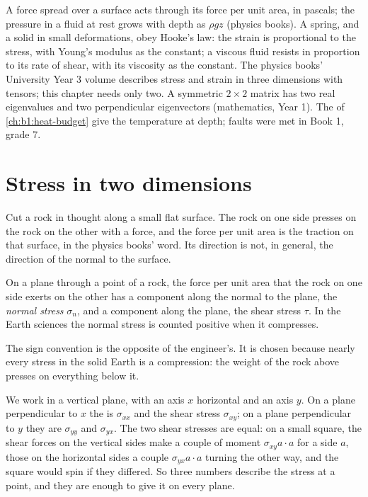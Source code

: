 \begin{recall}
A force spread over a surface acts through its force per unit area, in pascals;
the pressure in a fluid at rest grows with depth as $\rho g z$ (physics books).
A spring, and a solid in small deformations, obey Hooke's law: the strain is
proportional to the stress, with Young's modulus as the constant; a viscous
fluid resists in proportion to its rate of shear, with its viscosity as the
constant. The physics books' University Year 3 volume describes stress and
strain in three dimensions with tensors; this chapter needs only two. A
symmetric $2\times2$ matrix has two real eigenvalues and two perpendicular
eigenvectors (mathematics, Year 1). The  of
\cref{ch:b1:heat-budget} give the temperature at depth; faults were met in
Book 1, grade 7.
\end{recall}

\section{Stress in two dimensions}\label{sec:b1:stress-strain-rheology:stress}

Cut a rock in thought along a small flat surface. The rock on one side presses
on the rock on the other with a force, and the force per unit area is the
traction on that surface, in the physics books' word. Its direction is not, in
general, the direction of the normal to the surface.

\begin{definition}\label{def:b1:stress-strain-rheology:stress}
On a plane through a point of a rock, the force per unit area that the rock on
one side exerts on the other has a component along the normal to the plane,
the \emph{normal stress} $\sigma_n$, and a component
along the plane, the shear stress $\tau$. In the Earth sciences the normal
stress is counted positive when it compresses.
\end{definition}

The sign convention is the opposite of the engineer's. It is chosen because
nearly every stress in the solid Earth is a compression: the weight of the
rock above presses on everything below it.

We work in a vertical plane, with an axis $x$ horizontal and an axis $y$. On a
plane perpendicular to $x$ the  is $\sigma_{xx}$ and the shear
stress $\sigma_{xy}$; on a plane perpendicular to $y$ they are $\sigma_{yy}$
and $\sigma_{yx}$. The two shear stresses are equal: on a small square, the
shear forces on the vertical sides make a couple of moment
$\sigma_{xy}a\cdot a$ for a side $a$, those on the horizontal sides a couple
$\sigma_{yx}a\cdot a$ turning the other way, and the square would spin if
they differed. So three numbers describe the stress at a point, and they are
enough to give it on every plane.

